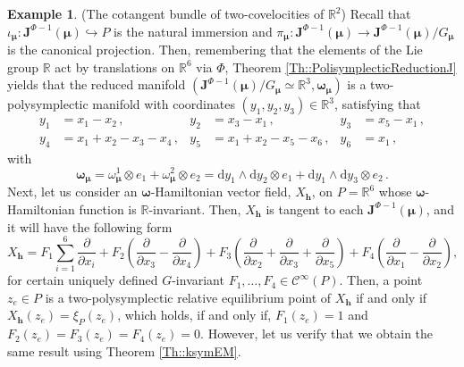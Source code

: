 \documentclass[11pt]{article}
\theoremstyle{plain}
\theoremstyle{definition}
\newtheorem{example}[theorem]{Example}
\newcommand{\R}{\mathbb{R}}
\newcommand{\Cinfty}{\mathscr{C}^\infty}
\newcommand{\bh}{{\boldsymbol{h}}}
\renewcommand{\d}{\mathrm{d}}
\def\d{\mathrm{d}}
\numberwithin{equation}{section}
\begin{document}
\begin{example}{(The cotangent bundle of two-covelocities of $\R^2$)}
Recall that $\iota_{\bm\mu}:\mathbf{J}^{\Phi-1}(\boldsymbol{\mu})\hookrightarrow P$ is the natural immersion and $\pi_{\boldsymbol{\mu}}:\mathbf{J}^{\Phi-1}(\boldsymbol{\mu})\rightarrow \mathbf{J}^{\Phi-1}(\boldsymbol{\mu})/G_{\boldsymbol{\mu}}$ is the canonical projection. Then, remembering that the elements of the Lie group $\mathbb{R}$ act by translations on $\mathbb{R}^6$ via $\Phi$, Theorem \ref{Th::PolisymplecticReductionJ} yields that the reduced manifold $(\mathbf{J}^{\Phi-1}(\boldsymbol{\mu})/G_{\boldsymbol{\mu}}\simeq \mathbb{R}^3,\boldsymbol{\omega}_{\boldsymbol{\mu}})$ is a two-polysymplectic manifold with coordinates $(y_1,y_2,y_3)\in\mathbb{R}^3$, satisfying that
\begin{align*}
y_1&=x_1-x_2\,,& y_2&=x_3-x_1\,,& y_3&=x_5-x_1\,,\\ y_4&=x_1+x_2-x_3-x_4\,,&
y_5&=x_1+x_2-x_5-x_6\,,
& y_6&=x_1\,,
\end{align*}
with
\[
\boldsymbol{\omega}_{\boldsymbol{\mu}}=\omega^1_{\boldsymbol{\mu}}\otimes e_1 + \omega^2_{\boldsymbol{\mu}}\otimes e_2=\d y_1\wedge \d y_2\otimes e_1+\d y_1\wedge \d y_3 \otimes e_2\,.
\]
Next, let us consider an $\bm{\omega}$-Hamiltonian vector field, $X_{\bm{h}}$, on $P=\mathbb{R}^6$ whose $\bm\omega$-Hamiltonian function is $\mathbb{R}$-invariant. Then, $X_{\bm{h}}$ is tangent to each $\mathbf{J}^{\Phi-1}(\boldsymbol{\mu})$, and it will have the following form
\[
X_{\bh}=F_1\sum^6_{i=1}\frac{\partial}{\partial x_i}+F_2\left(\frac{\partial}{\partial x_3}-\frac{\partial}{\partial x_4}\right)+F_3\left(\frac{\partial}{\partial x_2}+\frac{\partial}{\partial x_3}+\frac{\partial}{\partial x_5}\right)+F_4\left(\frac{\partial}{\partial x_1}-\frac{\partial}{\partial x_2}\right),
\]
for certain uniquely defined $G$-invariant $F_1,\ldots,F_4\in \Cinfty(P)$. Then, a point $z_e\in P$ is a two-polysymplectic relative equilibrium point of $X_\bh$ if and only if $X_\bh(z_e)=\xi_P(z_e)$, which holds, if and only if, $F_1(z_e)=1$ and $F_2(z_e)=F_3(z_e)=F_4(z_e)=0$. However, let us verify that we obtain the same result using Theorem \ref{Th::ksymEM}. 


\end{example}
\end{document}
